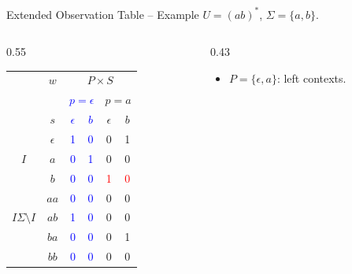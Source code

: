 \documentclass{beamer}
\begin{document}
\begin{frame}{Extended Observation Table -- Example}
    $U=(ab)^*$, \qquad $\Sigma=\{a,b\}$.
    \vspace{0.4em}
    \begin{columns}[T,onlytextwidth]
        \begin{column}{0.55\textwidth}
            \centering
            \small
            \setlength{\tabcolsep}{4pt}
            \renewcommand{\arraystretch}{1.05}
            \begin{tabular}{cc|cc|cc}
                & $w$ & \multicolumn{4}{c}{$P\times S$}\\
                & & \multicolumn{2}{c|}{\textcolor{blue}{$p=\epsilon$}}
                  & \multicolumn{2}{c}{$p=a$}\\
                & $s$ & \textcolor{blue}{$\epsilon$}
                      & \textcolor{blue}{$b$} & $\epsilon$ & $b$\\ \hline
                & $\epsilon$ & \textcolor{blue}{1} & \textcolor{blue}{0} & 0 & 1\\
                $I$ & $a$    & \textcolor{blue}{0} & \textcolor{blue}{1} & 0 & 0\\
                & $b$ & \textcolor{blue}{0} & \textcolor{blue}{0}
                    & \textcolor{red}{1} & \textcolor{red}{0}\\ \hline
                & $aa$ & \textcolor{blue}{0} & \textcolor{blue}{0} & 0 & 0\\
                $I\Sigma\setminus I$ & $ab$
                    & \textcolor{blue}{1} & \textcolor{blue}{0} & 0 & 0\\
                & $ba$ & \textcolor{blue}{0} & \textcolor{blue}{0} & 0 & 1\\
                & $bb$ & \textcolor{blue}{0} & \textcolor{blue}{0} & 0 & 0\\ \hline
            \end{tabular}
            \par\vspace{0.4em}
        \end{column}
        \begin{column}{0.43\textwidth}
            \small
            \begin{itemize}
                \item $P=\{\epsilon,a\}$: left contexts.

\end{itemize}
\end{column}
\end{columns}
\end{frame}
\end{document}
